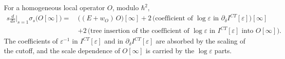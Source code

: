 \begin{theorem}
\label{thm:c6-CS}
For a homogeneous local operator $O$, modulo $\hbar^2$,
\begin{equation}
\begin{aligned}
s\frac{d}{ds}\Big|_{s=1}\sigma_s\big(O[\infty]\big)=\ &\big((E+w_O)\,O\big)[\infty]+2\,\big(\text{coefficient of }\log\varepsilon\text{ in }\partial_\delta I^{CT}[\varepsilon]\big)[\infty]\\
&+2\,\big(\text{tree insertion of the coefficient of }\log\varepsilon\text{ in }I^{CT}[\varepsilon]\text{ into }O[\infty]\big).
\end{aligned}
\label{eq:c6-CS}
\end{equation}
The coefficients of $\varepsilon^{-1}$ in $I^{CT}[\varepsilon]$ and in $\partial_\delta I^{CT}[\varepsilon]$ are absorbed by the scaling of the cutoff, and the scale dependence of $O[\infty]$ is carried by the $\log\varepsilon$ parts.
\end{theorem}

